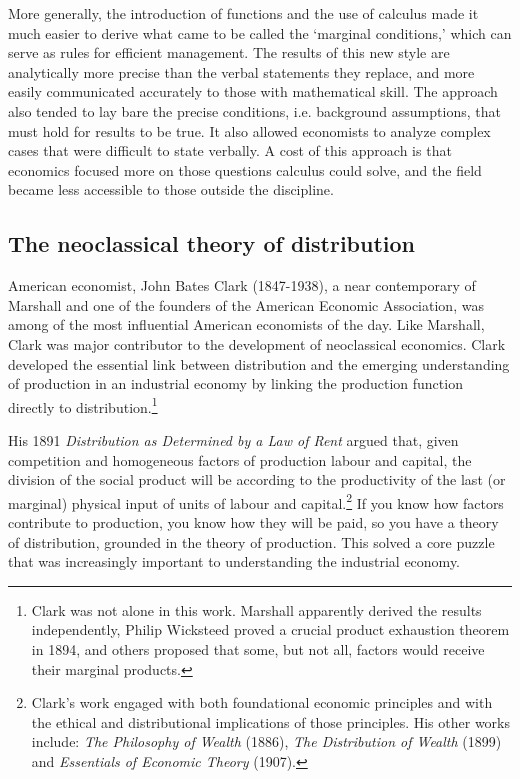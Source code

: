 
 More generally, the introduction of functions and the use of calculus made it much easier to derive what came to be called the `marginal conditions,' which can serve as rules for efficient management. The results of this new style are analytically more precise than the verbal statements they replace, and more easily communicated accurately to those with mathematical skill. The approach also tended to lay bare the precise conditions, i.e. background assumptions, that must hold for results to be true. It also allowed economists to analyze complex cases that were difficult to state verbally. A cost of this approach is that economics focused more on those questions calculus could solve, and the field became less accessible to those outside the discipline.

\subsection{The neoclassical theory of distribution}
American economist, John Bates Clark (1847-1938), a near contemporary of Marshall and one of the founders of the American Economic Association, was among of the most influential American economists of the day. Like Marshall, Clark was major contributor to the development of neoclassical economics. 
Clark developed the essential link between distribution and the emerging understanding of production in an industrial economy by linking the production function directly to distribution.\footnote{Clark was not alone in this work. Marshall apparently derived the results independently, Philip Wicksteed proved a crucial product exhaustion theorem in 1894, and others proposed that some, but not all, factors would receive their marginal products.} 

His 1891 \textit{Distribution as Determined by a Law of Rent} \cite{clarkDistributionDeterminedLaw1891} argued that, given competition and homogeneous factors of production labour and capital, the division of the social product will be according to the productivity of the last (or marginal) physical input of units of labour and capital.\footnote{Clark's work engaged with both foundational economic principles and with the ethical and distributional implications of those principles. His other works include: \textit{The Philosophy of Wealth} (1886), \textit{The Distribution of Wealth} (1899) and \textit{Essentials of Economic Theory} (1907).} 
If you know how factors contribute to production, you know how they will be paid, so you have a theory of distribution, grounded in the theory of production. This solved a core puzzle that was increasingly important to understanding the industrial economy.

